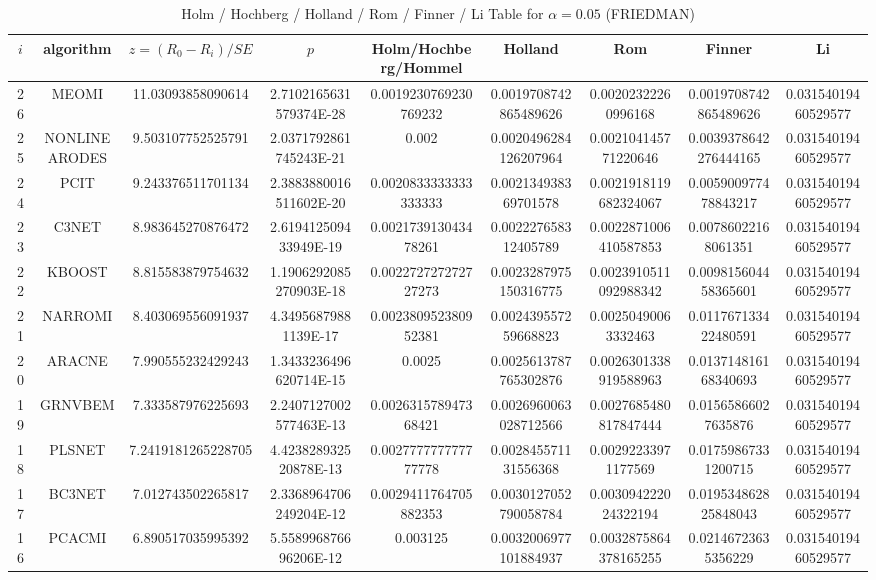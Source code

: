 \documentclass[a4paper,10pt]{article}
\begin{document}
\begin{landscape}
\begin{table}[!htp]
\begin{tabular}{
|r|r|r|r|r|r|r|r|r|r|r|r|r|r|r|r|r|r|r|r|r|r|r|r|r|r|r|r|}
\end{tabular}
\end{table}

\newpage

\begin{table}[!htp]
\centering\scriptsize
\caption{Holm / Hochberg / Holland / Rom / Finner / Li Table for $\alpha=0.05$ (FRIEDMAN)}
\begin{tabular}{ccccccccc}
$i$&algorithm&$z=(R_0 - R_i)/SE$&$p$&Holm/Hochberg/Hommel&Holland&Rom&Finner&Li\\
\hline
26&MEOMI&11.03093858090614&2.7102165631579374E-28&0.0019230769230769232&0.0019708742865489626&0.00202322260996168&0.0019708742865489626&0.03154019460529577\\
25&NONLINEARODES&9.503107752525791&2.0371792861745243E-21&0.002&0.0020496284126207964&0.002104145771220646&0.0039378642276444165&0.03154019460529577\\
24&PCIT&9.243376511701134&2.3883880016511602E-20&0.0020833333333333333&0.002134938369701578&0.0021918119682324067&0.005900977478843217&0.03154019460529577\\
23&C3NET&8.983645270876472&2.619412509433949E-19&0.002173913043478261&0.002227658312405789&0.0022871006410587853&0.00786022168061351&0.03154019460529577\\
22&KBOOST&8.815583879754632&1.1906292085270903E-18&0.002272727272727273&0.0023287975150316775&0.0023910511092988342&0.009815604458365601&0.03154019460529577\\
21&NARROMI&8.403069556091937&4.34956879881139E-17&0.002380952380952381&0.002439557259668823&0.00250490063332463&0.011767133422480591&0.03154019460529577\\
20&ARACNE&7.990555232429243&1.3433236496620714E-15&0.0025&0.0025613787765302876&0.0026301338919588963&0.013714816168340693&0.03154019460529577\\
19&GRNVBEM&7.333587976225693&2.2407127002577463E-13&0.002631578947368421&0.0026960063028712566&0.0027685480817847444&0.01565866027635876&0.03154019460529577\\
18&PLSNET&7.2419181265228705&4.423828932520878E-13&0.002777777777777778&0.002845571131556368&0.00292233971177569&0.01759867331200715&0.03154019460529577\\
17&BC3NET&7.012743502265817&2.3368964706249204E-12&0.0029411764705882353&0.0030127052790058784&0.003094222024322194&0.019534862825848043&0.03154019460529577\\
16&PCACMI&6.890517035995392&5.558996876696206E-12&0.003125&0.0032006977101884937&0.0032875864378165255&0.02146723635356229&0.03154019460529577\\

\end{tabular}
\end{table}
\end{landscape}
\end{document}
